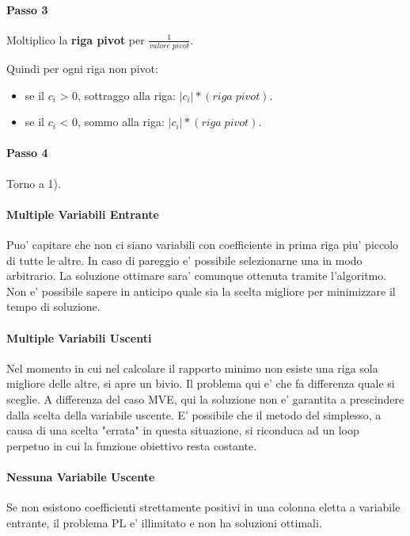 \paragraph{Passo 3}

Moltiplico la \textbf{riga pivot} per $\frac {1} {valore \; pivot}$.

Quindi per ogni riga non pivot:
\begin{itemize}
    \item se il $c_i$ > 0, sottraggo alla riga: $|c_i| * (riga \; pivot)$.
    \item se il $c_i$ < 0, sommo alla riga: $|c_i| * (riga \; pivot)$.
\end{itemize}

\paragraph{Passo 4}

Torno a 1).

\paragraph{Multiple Variabili Entrante}
Puo' capitare che non ci siano variabili con coefficiente in prima riga piu' piccolo di tutte le altre. In caso di pareggio e' possibile selezionarne una in modo arbitrario. La soluzione ottimare sara' comunque ottenuta tramite l'algoritmo. Non e' possibile sapere in anticipo quale sia la scelta migliore per minimizzare il tempo di soluzione.

\paragraph{Multiple Variabili Uscenti}

Nel momento in cui nel calcolare il rapporto minimo non esiste una riga sola migliore delle altre, si apre un bivio. Il problema qui e' che fa differenza quale si sceglie. A differenza del caso MVE, qui la soluzione non e' garantita a prescindere dalla scelta della variabile uscente.
E' possibile che il metodo del simplesso, a causa di una scelta "errata" in questa situazione, si riconduca ad un loop perpetuo in cui la funzione obiettivo resta costante.

\paragraph{Nessuna Variabile Uscente}

Se non esistono coefficienti strettamente positivi in una colonna eletta a variabile entrante, il problema PL e' illimitato e non ha soluzioni ottimali.

